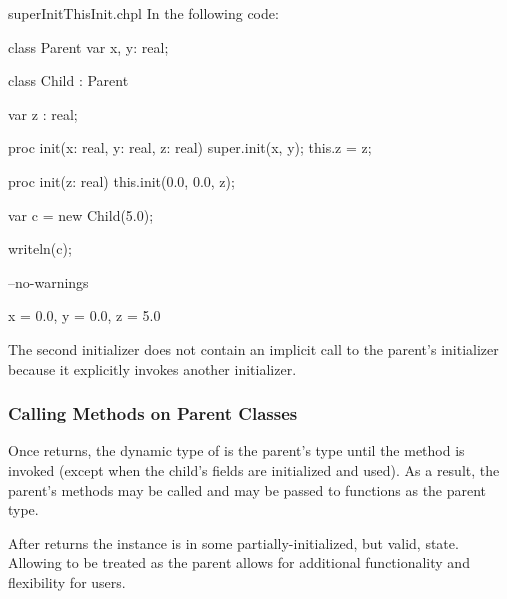 \begin{chapelexample}{superInitThisInit.chpl}
In the following code:
\begin{chapel}
class Parent {
  var x, y: real;
}

class Child : Parent {
  var z : real;

  proc init(x: real, y: real, z: real) {
    super.init(x, y);
    this.z = z;
  }

  proc init(z: real) {
    this.init(0.0, 0.0, z);
  }
}

var c = new Child(5.0);
\end{chapel}
\begin{chapelpost}
writeln(c);
\end{chapelpost}
\begin{chapelcompopts}
--no-warnings
\end{chapelcompopts}
\begin{chapeloutput}
{x = 0.0, y = 0.0, z = 5.0}
\end{chapeloutput}
The second initializer does not contain an implicit call to the parent's
initializer because it explicitly invokes another initializer.
\end{chapelexample}

\subsubsection{Calling Methods on Parent Classes}
\label{Calling_Methods_on_Parent_Classes}

Once  returns, the dynamic type of  is the
parent's type until the  method is invoked (except when the
child's fields are initialized and used). As a result, the parent's methods
may be called and  may be passed to functions as the parent type.

\begin{rationale}
After  returns the instance is in some
partially-initialized, but valid, state. Allowing  to be treated as
the parent allows for additional functionality and flexibility for users.
\end{rationale}


